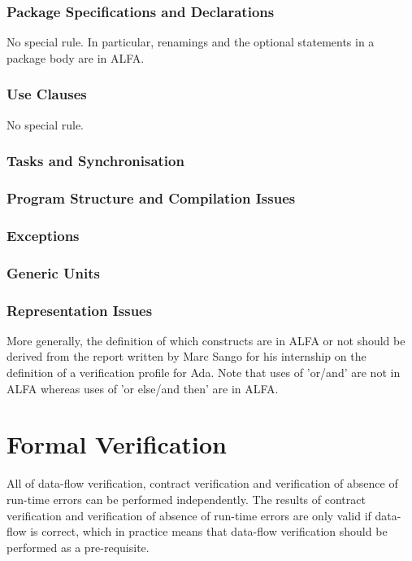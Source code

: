 \documentclass{article}
\begin{document}

\subsubsection{Package Specifications and Declarations}

No special rule. In particular, renamings and the optional statements in a
package body are in ALFA.

\subsubsection{Use Clauses}

No special rule.

\subsubsection{Tasks and Synchronisation}
\subsubsection{Program Structure and Compilation Issues}
\subsubsection{Exceptions}
\subsubsection{Generic Units}
\subsubsection{Representation Issues}

More generally, the definition of which constructs are in ALFA or not should be
derived from the report written by Marc Sango for his internship on the
definition of a verification profile for Ada. Note that uses of 'or/and' are
not in ALFA whereas uses of 'or else/and then' are in ALFA.

\section{Formal Verification}

All of data-flow verification, contract verification and verification of
absence of run-time errors can be performed independently. The results of
contract verification and verification of absence of run-time errors are only
valid if data-flow is correct, which in practice means that data-flow
verification should be performed as a pre-requisite.
\end{document}
